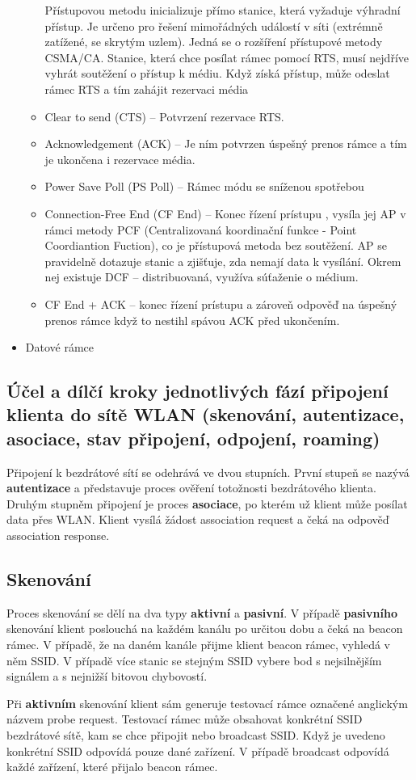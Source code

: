 \begin{itemize}
\begin{itemize}
Přístupovou metodu inicializuje přímo stanice, která vyžaduje výhradní přístup. Je určeno pro řešení
mimořádných událostí v síti (extrémně zatížené, se skrytým uzlem). Jedná se o rozšíření přístupové
metody CSMA/CA. Stanice, která chce posílat rámec pomocí RTS, musí nejdříve vyhrát soutěžení o
přístup k médiu. Když získá přístup, může odeslat rámec RTS a tím zahájit rezervaci média
\item Clear to send (CTS) --  Potvrzení rezervace RTS. 
\item Acknowledgement (ACK) -- Je ním potvrzen úspešný prenos rámce a tím je ukončena i rezervace
média. 
\item Power Save Poll (PS Poll) -- Rámec módu se sníženou spotřebou
\item Connection-Free End (CF End)  -- Konec řízení prístupu , vysíla jej AP v rámci metody PCF
(Centralizovaná koordinační funkce - Point Coordiantion Fuction), co je přístupová metoda bez
soutěžení. AP se pravidelně dotazuje stanic a zjišťuje, zda nemají data k vysílání. Okrem nej existuje
DCF – distribuovaná, využíva súťaženie o médium. 
\item CF End + ACK -- konec řízení prístupu a zároveň odpověď na úspešný prenos rámce když to nestihl
spávou ACK před ukončením. 
\end{itemize}
\item Datové rámce
\end{itemize}
\subsection{Účel a dílčí kroky jednotlivých fází připojení klienta do sítě WLAN (skenování, autentizace, asociace, stav připojení, odpojení, roaming)}
Připojení k bezdrátové sítí se odehrává ve dvou stupních. První stupeň se nazývá \textbf{autentizace} a představuje proces ověření totožnosti bezdrátového klienta. Druhým stupněm připojení je proces \textbf{asociace}, po kterém už klient může posílat data přes WLAN. Klient vysílá žádost association request a čeká na odpověď association response.
\subsection{Skenování}
Proces skenování se dělí na dva typy \textbf{aktivní} a \textbf{pasivní}. V případě \textbf{pasivního} skenování klient poslouchá na každém kanálu po určitou dobu a čeká na beacon rámec. V případě, že na daném kanále přijme klient beacon rámec, vyhledá v něm SSID. V případě více stanic se stejným SSID vybere bod s nejsilnějším signálem a s nejnižší bitovou chybovostí.\par
Při \textbf{aktivním} skenování klient sám generuje testovací rámce označené anglickým názvem probe request. Testovací rámec může obsahovat konkrétní SSID bezdrátové sítě, kam se chce připojit nebo broadcast SSID. Když je uvedeno konkrétní SSID odpovídá pouze dané zařízení. V případě broadcast odpovídá každé zařízení, které přijalo beacon rámec.
